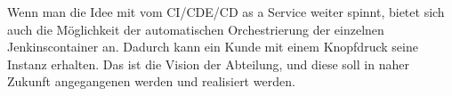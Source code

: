 Wenn man die Idee mit vom \ac{CI}/\ac{CDE}/\ac{CD} as a Service weiter spinnt, bietet sich auch die Möglichkeit der automatischen Orchestrierung der einzelnen Jenkinscontainer an. Dadurch kann ein Kunde mit einem Knopfdruck seine Instanz erhalten. Das ist die Vision der Abteilung, und diese soll in naher Zukunft angegangenen werden und realisiert werden.